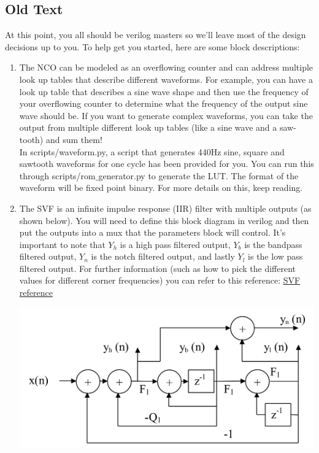 \documentclass[11pt]{article}
\begin{document}
\subsection{Old Text}
At this point, you all should be verilog masters so we'll leave most of the design decisions up to you. To help get you started, here are some block descriptions:
\begin{enumerate}
    \item The NCO can be modeled as an overflowing counter and can address multiple look up tables that describe different waveforms. For example, you can have a look up table that describes a sine wave shape and then use the frequency of your overflowing counter to determine what the frequency of the output sine wave should be. If you want to generate complex waveforms, you can take the output from multiple different look up tables (like a sine wave and a saw-tooth) and sum them! \\
    \newline
    In scripts/waveform.py, a script that generates 440Hz sine, square and sawtooth waveforms for one cycle has been provided for you. You can run this through scripts/rom$\_$generator.py to generate the LUT.
    The format of the waveform will be fixed point binary. For more details on this, keep reading.

    \item The SVF is an infinite impulse response (IIR) filter with multiple outputs (as shown below). You will need to define this block diagram in verilog and then put the outputs into a mux that the parameters block will control. It's important to note that $Y_h$ is a high pass filtered output, $Y_b$ is the bandpass filtered output, $Y_n$ is the notch filtered output, and lastly $Y_l$ is the low pass filtered output. For further information (such as how to pick the different values for different corner frequencies) you can refer to this reference: \href{https://karmafx.net/dochttps://www.overleaf.com/project/5dcf205cde307800019d9e74s/karmafx_digitalfilters.pdf}{SVF reference}
        \begin{center}
        \includegraphics[width=\textwidth/2]{images/svf.png}
        \end{center}


\end{enumerate}
\end{document}
